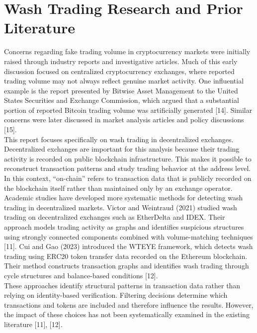 \documentclass[language=english,thesis=bachelor,nosecondtitle,faculty=cb,onesided,12pt]{hsmw-thesis}
\begin{document}
	\section{Wash Trading Research and Prior Literature}
Concerns regarding fake trading volume in cryptocurrency markets were initially raised through industry reports and investigative articles. Much of this early discussion focused on centralized cryptocurrency exchanges, where reported trading volume may not always reflect genuine market activity. One influential example is the report presented by Bitwise Asset Management to the United States Securities and Exchange Commission, which argued that a substantial portion of reported Bitcoin trading volume was artificially generated [14]. Similar concerns were later discussed in market analysis articles and policy discussions [15].\\
This report focuses specifically on wash trading in decentralized exchanges. Decentralized exchanges are important for this analysis because their trading activity is recorded on public blockchain infrastructure. This makes it possible to reconstruct transaction patterns and study trading behavior at the address level. In this context, “on-chain” refers to transaction data that is publicly recorded on the blockchain itself rather than maintained only by an exchange operator.\\
Academic studies have developed more systematic methods for detecting wash trading in decentralized markets. Victor and Weintraud (2021) studied wash trading on decentralized exchanges such as EtherDelta and IDEX. Their approach models trading activity as graphs and identifies suspicious structures using strongly connected components combined with volume-matching techniques [11].
Cui and Gao (2023) introduced the WTEYE framework, which detects wash trading using ERC20 token transfer data recorded on the Ethereum blockchain. Their method constructs transaction graphs and identifies wash trading through cycle structures and balance-based conditions [12].\\
These approaches identify structural patterns in transaction data rather than relying on identity-based verification. Filtering decisions determine which transactions and tokens are included and therefore influence the results. However, the impact of these choices has not been systematically examined in the existing literature [11], [12].
\end{document}
